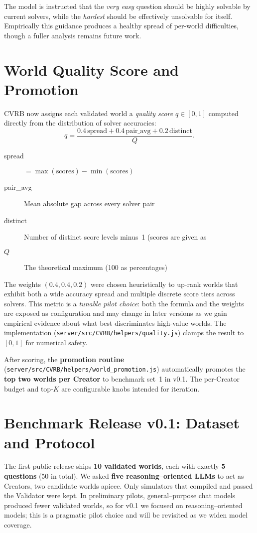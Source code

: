 \documentclass[11pt]{article}
\begin{document}
The model is instructed that the \emph{very easy} question should be highly solvable by current solvers, while the \emph{hardest} should be effectively unsolvable for itself. Empirically this guidance produces a healthy spread of per-world difficulties, though a fuller analysis remains future work. 

\section{World Quality Score and Promotion}
\label{sec:quality}
CVRB now assigns each validated world a \emph{quality score} $q\in[0,1]$ computed directly from the distribution of solver accuracies:
\[
q = \frac{0.4\,\text{spread}+0.4\,\text{pair\_avg}+0.2\,\text{distinct}}{Q}.
\]
\begin{description}
  \item[spread] $=\max(\text{scores})-\min(\text{scores})$
  \item[pair\_avg] Mean absolute gap across every solver pair
  \item[distinct] Number of distinct score levels minus~1 (scores are given as %
  \item[$Q$] The theoretical maximum (100 as percentages)
\end{description}
The weights \((0.4,0.4,0.2)\) were chosen heuristically to up-rank worlds that exhibit both a wide accuracy spread and multiple discrete score tiers across solvers.
This metric is a \emph{tunable pilot choice}: both the formula and the weights are exposed as configuration and may change in later versions as we gain empirical evidence about what best discriminates high-value worlds.
The implementation (\verb|server/src/CVRB/helpers/quality.js|) clamps the result to $[0,1]$ for numerical safety.

After scoring, the \textbf{promotion routine} (\verb|server/src/CVRB/helpers/world_promotion.js|) automatically promotes the \textbf{top two worlds per Creator} to benchmark set~1 in v0.1. The per-Creator budget and top-$K$ are configurable knobs intended for iteration.

\section{Benchmark Release v0.1: Dataset and Protocol}
The first public release ships \textbf{10 validated worlds}, each with exactly \textbf{5 questions} (50 in total). We asked \textbf{five reasoning--oriented LLMs} to act as Creators, two candidate worlds apiece. Only simulators that compiled and passed the Validator were kept. In preliminary pilots, general--purpose chat models produced fewer validated worlds, so for v0.1 we focused on reasoning--oriented models; this is a pragmatic pilot choice and will be revisited as we widen model coverage.
\end{document}
